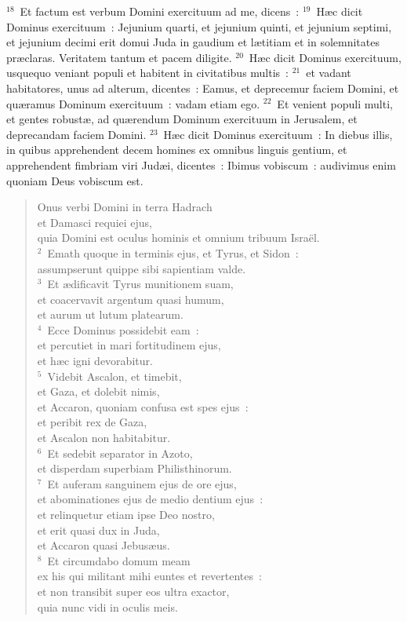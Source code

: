 ${}^{18}$~Et factum est verbum Domini exercituum ad me, dicens~:
${}^{19}$~H\ae c dicit Dominus exercituum~: Jejunium quarti, et jejunium quinti, et jejunium septimi, et jejunium decimi erit domui Juda in gaudium et l\ae titiam et in solemnitates pr\ae claras. Veritatem tantum et pacem diligite.
${}^{20}$~H\ae c dicit Dominus exercituum, usquequo veniant populi et habitent in civitatibus multis~:
${}^{21}$~et vadant habitatores, unus ad alterum, dicentes~: Eamus, et deprecemur faciem Domini, et qu\ae ramus Dominum exercituum~: vadam etiam ego.
${}^{22}$~Et venient populi multi, et gentes robust\ae , ad qu\ae rendum Dominum exercituum in Jerusalem, et deprecandam faciem Domini.
${}^{23}$~H\ae c dicit Dominus exercituum~: In diebus illis, in quibus apprehendent decem homines ex omnibus linguis gentium, et apprehendent fimbriam viri Jud\ae i, dicentes~: Ibimus vobiscum~: audivimus enim quoniam Deus vobiscum est.
\begin{flushleft}\begin{verse}\vspace{-19pt}Onus verbi Domini in terra Hadrach\\ et Damasci requiei ejus,\\ quia Domini est oculus hominis et omnium tribuum Isra\"el.\\
${}^{2}$~Emath quoque in terminis ejus, et Tyrus, et Sidon~:\\ assumpserunt quippe sibi sapientiam valde.\\
${}^{3}$~Et \ae dificavit Tyrus munitionem suam,\\ et coacervavit argentum quasi humum,\\ et aurum ut lutum platearum.\\
${}^{4}$~Ecce Dominus possidebit eam~:\\ et percutiet in mari fortitudinem ejus,\\ et h\ae c igni devorabitur.\\
${}^{5}$~Videbit Ascalon, et timebit,\\ et Gaza, et dolebit nimis,\\ et Accaron, quoniam confusa est spes ejus~:\\ et peribit rex de Gaza,\\ et Ascalon non habitabitur.\\
${}^{6}$~Et sedebit separator in Azoto,\\ et disperdam superbiam Philisthinorum.\\
${}^{7}$~Et auferam sanguinem ejus de ore ejus,\\ et abominationes ejus de medio dentium ejus~:\\ et relinquetur etiam ipse Deo nostro,\\ et erit quasi dux in Juda,\\ et Accaron quasi Jebus\ae us.\\
${}^{8}$~Et circumdabo domum meam\\ ex his qui militant mihi euntes et revertentes~:\\ et non transibit super eos ultra exactor,\\ quia nunc vidi in oculis meis.\end{verse}\end{flushleft}


